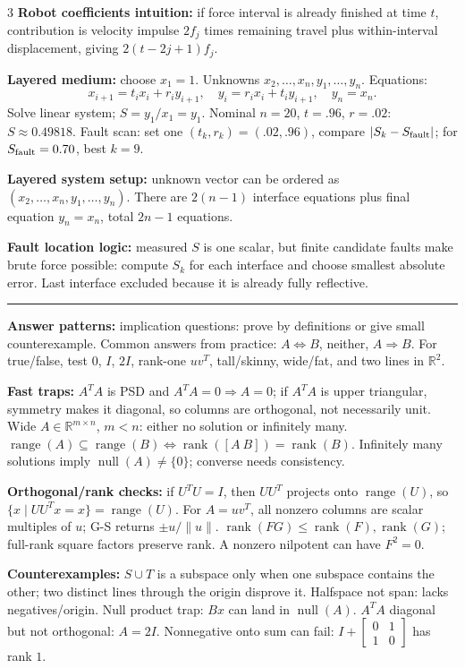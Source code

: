 \documentclass[10pt]{article}
\newcommand{\sect}[1]{\vspace{0.9pt}{\fontsize{7.2}{7.5}\selectfont\textbf{#1}}\vspace{0.25pt}\hrule\vspace{0.8pt}}
\newcommand{\sub}[1]{\textbf{#1}}
\newcommand{\R}{\mathbb{R}}
\newcommand{\rank}{\operatorname{rank}}
\newcommand{\range}{\operatorname{range}}
\newcommand{\nullsp}{\operatorname{null}}
\begin{document}
\begin{multicols*}{3}
\sub{Robot coefficients intuition:} if force interval is already finished at time $t$, contribution is velocity impulse $2f_j$ times remaining travel plus within-interval displacement, giving $2(t-2j+1)f_j$.

\sub{Layered medium:} choose $x_1=1$. Unknowns $x_2,\ldots,x_n,y_1,\ldots,y_n$. Equations:
\[
x_{i+1}=t_ix_i+r_iy_{i+1},\quad y_i=r_ix_i+t_iy_{i+1},\quad y_n=x_n.
\]
Solve linear system; $S=y_1/x_1=y_1$. Nominal $n=20$, $t=.96$, $r=.02$: $S\approx0.49818$. Fault scan: set one $(t_k,r_k)=(.02,.96)$, compare $|S_k-S_{\rm fault}|$; for $S_{\rm fault}=0.70$, best $k=9$.

\sub{Layered system setup:} unknown vector can be ordered as $(x_2,\ldots,x_n,y_1,\ldots,y_n)$. There are $2(n-1)$ interface equations plus final equation $y_n=x_n$, total $2n-1$ equations.

\sub{Fault location logic:} measured $S$ is one scalar, but finite candidate faults make brute force possible: compute $S_k$ for each interface and choose smallest absolute error. Last interface excluded because it is already fully reflective.

\sect{Practice Midterm Fast Checks}
\sub{Answer patterns:} implication questions: prove by definitions or give
small counterexample. Common answers from practice: \(A\Leftrightarrow B\),
neither, \(A\Rightarrow B\). For true/false, test \(0\), \(I\), \(2I\),
rank-one \(uv^T\), tall/skinny, wide/fat, and two lines in \(\R^2\).

\sub{Fast traps:} \(A^TA\) is PSD and \(A^TA=0\Rightarrow A=0\); if
\(A^TA\) is upper triangular, symmetry makes it diagonal, so columns are
orthogonal, not necessarily unit. Wide
\(A\in\R^{m\times n}\), \(m<n\): either no solution or infinitely many.
\(\range(A)\subseteq\range(B)\iff\rank([A\ B])=\rank(B)\). Infinitely
many solutions imply \(\nullsp(A)\ne\{0\}\); converse needs consistency.

\sub{Orthogonal/rank checks:} if \(U^TU=I\), then \(UU^T\) projects onto
\(\range(U)\), so \(\{x\mid UU^Tx=x\}=\range(U)\). For \(A=uv^T\), all
nonzero columns are scalar multiples of \(u\); G-S returns
\(\pm u/\|u\|\). \(\rank(FG)\le\rank(F),\rank(G)\); full-rank square
factors preserve rank. A nonzero nilpotent can have \(F^2=0\).

\sub{Counterexamples:} \(S\cup T\) is a subspace only when one subspace
contains the other; two distinct lines through the origin disprove it.
Halfspace not span: lacks negatives/origin. Null product trap: \(Bx\) can
land in \(\nullsp(A)\). \(A^TA\) diagonal but not orthogonal: \(A=2I\).
Nonnegative onto sum can fail:
\(I+\begin{bmatrix}0&1\\1&0\end{bmatrix}\) has rank \(1\).

\end{multicols*}
\end{document}

